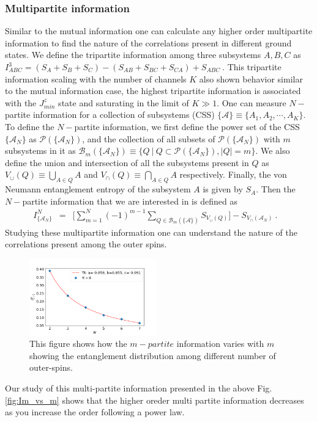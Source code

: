 \documentclass[reprint,prb,superscriptaddress]{revtex4-2}
\begin{document}
\subsubsection{Multipartite information}
\noindent Similar to the mutual information one can calculate any higher order multipartite information to find the nature of the correlations present in different ground states. We define the tripartite information among three subsystems $A,B,C$ as $I^3_{ABC} = (S_A+S_B+S_C)-(S_{AB}+S_{BC}+S_{CA})+S_{ABC}~$. This tripartite information scaling with the number of channels $K$ also shown behavior similar to the mutual information case, the highest tripartite information is associated with the $J^z_{min}$ state and saturating in the limit of $K\gg 1$. One can measure $N-$partite information for a collection of subsystems (CSS) $\{\mathcal{A}\}\equiv\{A_1,A_2,\cdots,A_K\}$. To define the $N-$partite information, we first define the power set of the CSS $\{\mathcal{A}_N\}$ as $\mathcal{P}(\{\mathcal{A}_{N}\})$, and the collection of all subsets of $\mathcal{P}(\{\mathcal{A}_{N}\})$ with $m$ subsystems in it as $\mathcal{B}_m(\{\mathcal{A}_N\})\equiv \{ Q~| ~Q\subset \mathcal{P}(\{\mathcal{A}_{N}\}), |Q|=m \}$. We also define the union and intersection of all the subsystems present in $Q$ as ${V}_{\cup}({Q})\equiv \bigcup_{A\in Q} A$ and ${V}_{\cap}({Q})\equiv \bigcap_{A\in Q} A$ respectively. Finally, the von Neumann entanglement entropy of the subsystem $A$ is given by $S_{A} $. Then the $N-$partite information that we are interested in is defined as
\begin{eqnarray}
I^{N}_{\{\mathcal{A}_N\}} &=& \bigg[\displaystyle\sum_{m=1}^{N} (-1)^{m-1} \displaystyle\sum_{Q \in \mathcal{B}_m(\{\mathcal{A}\})} S_{V_{\cup}({Q})} \bigg]- S_{V_{\cap}(\mathcal{A}_N)}~.~~~~
\label{eq:I_N_definition}
\end{eqnarray}
Studying these multipartite information one can understand the nature of the correlations present among the outer spins.
\begin{figure}
\includegraphics[width=0.49\textwidth]{plt/IN_vs_N_K8.png}
\caption{This figure shows how the $m-partite$ information varies with $m$ showing the entanglement distribution among different number of outer-spins.}
\label{fig:Im_vs_m}
\end{figure}
\noindent Our study of this multi-partite information presented in the above Fig.\eqref{fig:Im_vs_m} shows that the higher oreder multi partite information decreases as you increase the order following a power law.
\end{document}
